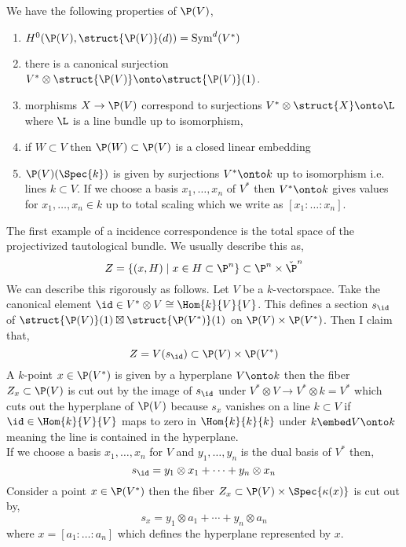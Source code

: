 \documentclass[12pt]{article}
\begin{document}
\begin{rmk}
We have the following properties of $\P(V)$,
\begin{enumerate}
\item $H^0(\P(V), \struct{\P(V)}(d)) = \mathrm{Sym}^d(V^*)$
\item there is a canonical surjection $V^* \otimes \struct{\P(V)} \onto \struct{\P(V)}(1)$.
\item morphisms $X \to \P(V)$ correspond to surjections $V^* \otimes \struct{X} \onto \L$ where $\L$ is a line bundle up to isomorphism,
\begin{center}
\end{center}
\item if $W \subset V$ then $\P(W) \subset \P(V)$ is a closed linear embedding
\item $\P(V)(\Spec{k})$ is given by surjections $V^* \onto k$ up to isomorphism i.e. lines $k \subset V$. If we choose a basis $x_1, \dots, x_n$ of $V^*$ then $V^* \onto k$ gives values for $x_1, \dots, x_n \in k$ up to total scaling which we write as $[x_1 : \dots : x_n]$.
\end{enumerate} 
\end{rmk}
\noindent
The first example of a incidence correspondence is the total space of the projectivized tautological bundle. We usually describe this as,
\[ Z = \{ (x, H) \mid x \in H \subset \P^n \} \subset \P^n \times \check{\P}^n \]
We can describe this rigorously as follows. Let $V$ be a $k$-vectorspace. Take the canonical element $\id \in V^* \otimes V \cong \Hom{k}{V}{V}$. This defines a section $s_{\id}$ of $\struct{\P(V)}(1) \boxtimes \struct{\P(V^*)}(1)$ on $\P(V) \times \P(V^*)$. Then I claim that,
\[ Z = V(s_{\id}) \subset \P(V) \times \P(V^*) \]
A $k$-point $x \in \P(V^*)$ is given by a hyperplane $V \onto k$ then the fiber $Z_x \subset \P(V)$ is cut out by the image of $s_\id$ under $V^* \otimes V \to V^* \otimes k = V^*$ which cuts out the hyperplane of $\P(V)$ because $s_x$ vanishes on a line $k \subset V$ if $\id \in \Hom{k}{V}{V}$ maps to zero in $\Hom{k}{k}{k}$ under $k \embed V \onto k$ meaning the line is contained in the hyperplane.
\bigskip\\
If we choose a basis $x_1, \dots, x_n$ for $V$ and $y_1, \dots, y_n$ is the dual basis of $V^*$ then,
\[ s_\id = y_1 \otimes x_1 + \cdots + y_n \otimes x_n \]
Consider a point $x \in \P(V^*)$ then the fiber $Z_x \subset \P(V) \times \Spec{\kappa(x)}$ is cut out by,
\[ s_x = y_1 \otimes a_1 + \cdots + y_n \otimes a_n \]
where $x = [a_1 : \dots : a_n]$ which defines the hyperplane represented by $x$. 
\end{document}
